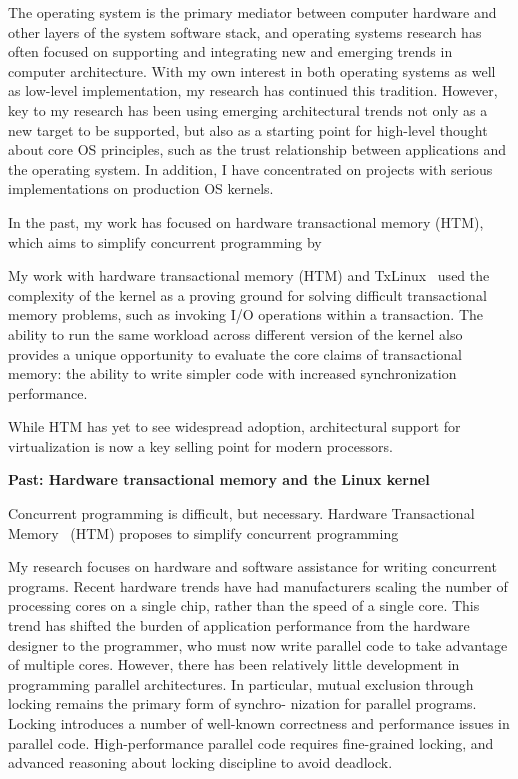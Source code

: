 \documentclass{article}
\begin{document}
The operating system is the primary mediator between computer hardware and
other layers of the system software stack, and operating systems research
has often focused on supporting and integrating new and emerging trends in
computer architecture. With my own interest in both operating systems as
well as low-level implementation, my research has continued this tradition.
However, key to my research has been using emerging architectural trends
not only as a new target to be supported, but also as a starting point for
high-level thought about core OS principles, such as the trust relationship
between applications and the operating system. In addition, I have
concentrated on projects with serious implementations on production OS
kernels.

In the past, my work has focused on hardware transactional memory (HTM),
which aims to simplify concurrent programming by 

My work with hardware transactional memory (HTM) and TxLinux~\cite{txlinux}
used the complexity of the kernel as a proving ground for solving difficult
transactional memory problems, such as invoking I/O operations within a
transaction. The ability to run the same workload across different version
of the kernel also provides a unique opportunity to evaluate the core
claims of transactional memory: the ability to write simpler code with
increased synchronization performance.

While HTM has yet to see widespread adoption, architectural support for
virtualization is now a key selling point for modern processors.

{\bigskip \noindent\bf Past: Hardware transactional memory and the Linux
kernel}

\noindent Concurrent programming is difficult, but necessary. Hardware
Transactional Memory~\cite{herlihy} (HTM) proposes to simplify concurrent
programming

My research focuses on hardware and software assistance for writing
concurrent programs. Recent hardware trends have had manufacturers scaling
the number of processing cores on a single chip, rather than the speed of a
single core.  This trend has shifted the burden of application performance
from the hardware designer to the programmer, who must now write parallel
code to take advantage of multiple cores. However, there has been
relatively little development in programming parallel architectures. In
particular, mutual exclusion through locking remains the primary form of
synchro- nization for parallel programs. Locking introduces a number of
well-known correctness and performance issues in parallel code.
High-performance parallel code requires fine-grained locking, and advanced
reasoning about locking discipline to avoid deadlock.
\end{document}
